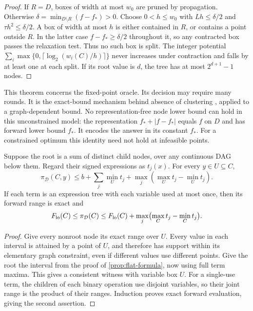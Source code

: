 \begin{proof}
If $R=D$, boxes of width at most $w_0$ are pruned by propagation.
Otherwise $\delta=\min_{D\setminus R}(f-f_*)>0$. Choose $0<h\le w_0$ with
$Lh\le\delta/2$ and $\tau h^2\le\delta/2$. A box of width at most $h$
is either contained in $R$, or contains a point outside $R$. In the latter
case $f-f_*\ge\delta/2$ throughout it, so any contracted box passes the
relaxation test. Thus no such box is split. The integer potential
$\sum_i\max\{0,\lceil\log_2(w_i(C)/h)\rceil\}$ never increases under
contraction and falls by at least one at each split. If its root value is
$d$, the tree has at most $2^{d+1}-1$ nodes.
\end{proof}

This theorem concerns the fixed-point oracle. Its decision may require
many rounds. It is the exact-bound mechanism behind absence of clustering
\citep{duKearfott1994Cluster,wechsungSchaberBarton2014Cluster}, applied to
a graph-dependent bound. No representation-free node lower bound can hold
in this unconstrained model: the representation
$f_*+|f-f_*|$ equals $f$ on $D$ and has forward lower bound $f_*$.
It encodes the answer in its constant $f_*$. For a constrained optimum this
identity need not hold at infeasible points.

\begin{lemma}
\label{prop:witness}
Suppose the root is a sum of distinct child nodes, over any continuous
DAG below them. Regard their signed expressions as $t_j(x)$. For every
$y\in U\subseteq C$,
\begin{equation}
 \pi_{\mathcal D}(C,y)\le
 b+\sum_j\min_Ut_j+\max_j\left(\max_Ut_j-\min_Ut_j\right).
 \label{prop:full-witness}
\end{equation}
If each term is an expression tree with each variable used at most once,
then its forward range is exact and
\[
 F_{\rm lo}(C)\le\pi_{\mathcal D}(C)
 \le F_{\rm lo}(C)+\max_j\bigl(\max_Ct_j-\min_Ct_j\bigr).
\]
\end{lemma}

\begin{proof}
Give every nonroot node its exact range over $U$. Every value in each
interval is attained by a point of $U$, and therefore has support within
its elementary graph constraint, even if different values use different
points. Give the root the interval from the proof of
\cref{prop:flat-formula}, now using full term maxima. This gives a
consistent witness with variable box $U$. For a single-use term, the
children of each binary operation use disjoint variables, so their joint
range is the product of their ranges. Induction proves exact forward
evaluation, giving the second assertion.
\end{proof}

